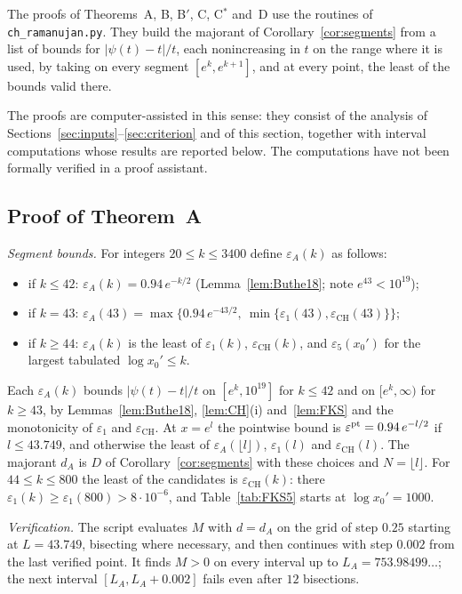 \documentclass{amsart}
\theoremstyle{definition}
\theoremstyle{remark}
\theoremstyle{plain}
\numberwithin{equation}{section}
\newcommand{\eps}{\varepsilon}
\newcommand{\epsCH}{\eps_{\mathrm{CH}}}
\newcommand{\Cstar}{C$^*$}
\newcommand{\Bp}{B$'$}
\begin{document}
The proofs of Theorems~A, B, \Bp, C, \Cstar{} and~D use the routines of \texttt{ch\_ramanujan.py}. They build the majorant of Corollary~\ref{cor:segments} from a list of bounds for $|\psi(t)-t|/t$, each nonincreasing in $t$ on the range where it is used, by taking on every segment $[e^k,e^{k+1}]$, and at every point, the least of the bounds valid there.

The proofs are computer-assisted in this sense: they consist of the analysis of Sections~\ref{sec:inputs}--\ref{sec:criterion} and of this section, together with interval computations whose results are reported below. The computations have not been formally verified in a proof assistant.

\subsection{Proof of Theorem~A}\label{sec:A}

\emph{Segment bounds.} For integers $20\le k\le3400$ define $\eps_A(k)$ as follows:
\begin{itemize}
\item if $k\le42$: $\eps_A(k)=0.94\,e^{-k/2}$ (Lemma~\ref{lem:Buthe18}; note $e^{43}<10^{19}$);
\item if $k=43$: $\eps_A(43)=\max\bigl\{0.94\,e^{-43/2},\ \min\{\eps_1(43),\epsCH(43)\}\bigr\}$;
\item if $k\ge44$: $\eps_A(k)$ is the least of $\eps_1(k)$, $\epsCH(k)$, and $\eps_5(x_0')$ for the largest tabulated $\log x_0'\le k$.
\end{itemize}
Each $\eps_A(k)$ bounds $|\psi(t)-t|/t$ on $[e^k,10^{19}]$ for $k\le42$ and on $[e^k,\infty)$ for $k\ge43$, by Lemmas~\ref{lem:Buthe18}, \ref{lem:CH}(i) and~\ref{lem:FKS} and the monotonicity of $\eps_1$ and $\epsCH$. At $x=e^l$ the pointwise bound is $\eps^{\rm pt}=0.94\,e^{-l/2}$ if $l\le43.749$, and otherwise the least of $\eps_A(\lfloor l\rfloor)$, $\eps_1(l)$ and $\epsCH(l)$. The majorant $d_A$ is $D$ of Corollary~\ref{cor:segments} with these choices and $N=\lfloor l\rfloor$. For $44\le k\le800$ the least of the candidates is $\epsCH(k)$: there $\eps_1(k)\ge\eps_1(800)>8\cdot10^{-6}$, and Table~\ref{tab:FKS5} starts at $\log x_0'=1000$.

\emph{Verification.} The script evaluates $M$ with $d=d_A$ on the grid of step $0.25$ starting at $L=43.749$, bisecting where necessary, and then continues with step $0.002$ from the last verified point. It finds $M>0$ on every interval up to $L_A=753.98499\ldots$; the next interval $[L_A,L_A+0.002]$ fails even after $12$ bisections.
\end{document}
